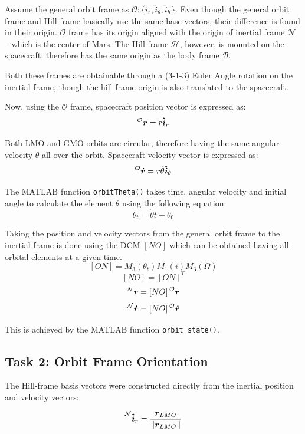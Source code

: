 \documentclass[12pt,a4paper]{report}
\begin{document}
	Assume the general orbit frame as $\mathcal{O}: \{\hat{i}_r, \hat{i}_\theta, \hat{i}_h\}$. Even though the general orbit frame and Hill frame basically use the same base vectors, their difference is found in their origin. $\mathcal{O}$ frame has its origin aligned with the origin of inertial frame $\mathcal{N}$ -- which is the center of Mars. The Hill frame $\mathcal{H}$, however, is mounted on the spacecraft, therefore has the same origin as the body frame $\mathcal{B}$. 
	
	Both these frames are obtainable through a (3-1-3) Euler Angle rotation on the inertial frame, though the hill frame origin is also translated to the spacecraft. 
	
	Now, using the $\mathcal{O}$ frame, spacecraft position vector is expressed as:
	$$\prescript{\mathcal{O}}{}{\boldsymbol{r}} = r\boldsymbol{\hat{i}}_r$$
	
	Both LMO and GMO orbits are circular, therefore having the same angular velocity $\dot{\theta}$ all over the orbit. Spacecraft velocity vector is expressed as:
	$$\prescript{\mathcal{O}}{}{\boldsymbol{\dot{r}}} = r\dot{\theta}\boldsymbol{\hat{i}}_\theta$$
	
	The MATLAB function \texttt{orbitTheta()} takes time, angular velocity and initial angle to calculate the element $\theta$ using the following equation:
	$$\theta_t = \dot{\theta}t + \theta_0$$
		
	Taking the position and velocity vectors from the general orbit frame to the inertial frame is done using the DCM $[NO]$ which can be obtained having all orbital elements at a given time.
	$$[ON] = M_3(\theta_t)M_1(i)M_3(\Omega)$$
	$$[NO] = [ON]^T$$
	$$\prescript{\mathcal{N}}{}{\boldsymbol{r}} = [NO] \prescript{\mathcal{O}}{}{\boldsymbol{r}}$$
	$$\prescript{\mathcal{N}}{}{\boldsymbol{\dot{r}}} = [NO] \prescript{\mathcal{O}}{}{\boldsymbol{\dot{r}}}$$
	
	This is achieved by the MATLAB function \texttt{orbit\_state()}.
	
	
	\subsection{Task 2: Orbit Frame Orientation}
	
	The Hill-frame basis vectors were constructed directly from the inertial position and velocity vectors:
	
	\[
	\prescript{\mathcal{N}}{}{\boldsymbol{\hat{i}}_r} = \frac{\boldsymbol{r}_{LMO}}{\|\boldsymbol{r}_{LMO}\|}
	\]
	
\end{document}
